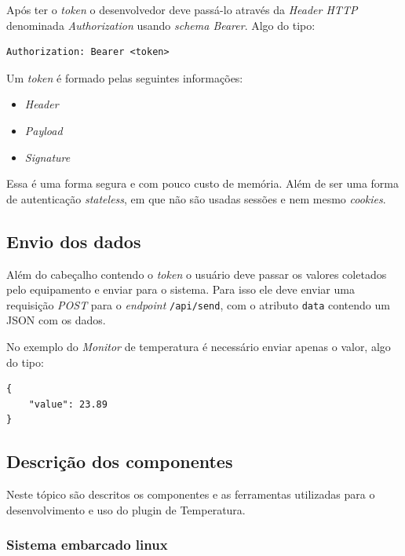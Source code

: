 Após ter o \emph{token} o desenvolvedor deve passá-lo através da
\emph{Header HTTP} denominada \emph{Authorization} usando \emph{schema
Bearer}. Algo do tipo:

\begin{verbatim}
Authorization: Bearer <token>
\end{verbatim}

Um \emph{token} é formado pelas seguintes informações:

\begin{itemize}
\itemsep1pt\parskip0pt
\item
  \emph{Header}
\item
  \emph{Payload}
\item
  \emph{Signature}
\end{itemize}

Essa é uma forma segura e com pouco custo de memória. Além de ser uma
forma de autenticação \emph{stateless}, em que não são usadas sessões e
nem mesmo \emph{cookies}.

\subsection{Envio dos dados}\label{envio-dos-dados}

Além do cabeçalho contendo o \emph{token} o usuário deve passar os
valores coletados pelo equipamento e enviar para o sistema. Para isso
ele deve enviar uma requisição \emph{POST} para o \emph{endpoint}
\texttt{/api/send}, com o atributo \texttt{data} contendo um JSON com os
dados.

No exemplo do \emph{Monitor} de temperatura é necessário enviar apenas o
valor, algo do tipo:

\begin{verbatim}
{
    "value": 23.89
}
\end{verbatim}

\subsection{Descrição dos
componentes}\label{descriuxe7uxe3o-dos-componentes}

Neste tópico são descritos os componentes e as ferramentas utilizadas
para o desenvolvimento e uso do plugin de Temperatura.

\subsubsection{Sistema embarcado linux}\label{sistema-embarcado-linux}

